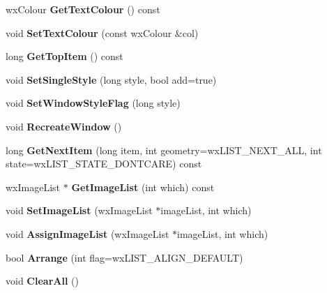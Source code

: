\begin{DoxyCompactItemize}
\item 
wxColour {\bfseries GetTextColour} () const \label{classMuleExtern_1_1wxGenericListCtrl_aceeba33a3060a6d8a3f05e4af5dd11f2}

\item 
void {\bfseries SetTextColour} (const wxColour \&col)\label{classMuleExtern_1_1wxGenericListCtrl_a15f3ca4c17eb562099e920ca160985a6}

\item 
long {\bfseries GetTopItem} () const \label{classMuleExtern_1_1wxGenericListCtrl_af7c938efcfb67ae9c679bbf781a3a7a1}

\item 
void {\bfseries SetSingleStyle} (long style, bool add=true)\label{classMuleExtern_1_1wxGenericListCtrl_af22cfbb9913852ce523922f6cfca16a2}

\item 
void {\bfseries SetWindowStyleFlag} (long style)\label{classMuleExtern_1_1wxGenericListCtrl_ae272368f381b9e2ed26b5ae1fe597c14}

\item 
void {\bfseries RecreateWindow} ()\label{classMuleExtern_1_1wxGenericListCtrl_a72739b9b268e01dd5c17028ea0ebf7e2}

\item 
long {\bfseries GetNextItem} (long item, int geometry=wxLIST\_\-NEXT\_\-ALL, int state=wxLIST\_\-STATE\_\-DONTCARE) const \label{classMuleExtern_1_1wxGenericListCtrl_a5eb13bcdfaec73eb60e7e4f31037eef2}

\item 
wxImageList $\ast$ {\bfseries GetImageList} (int which) const \label{classMuleExtern_1_1wxGenericListCtrl_a79a404b87229602db1b6322b5716abc5}

\item 
void {\bfseries SetImageList} (wxImageList $\ast$imageList, int which)\label{classMuleExtern_1_1wxGenericListCtrl_a6260d4dd6e931a4bf5cc26564d89074e}

\item 
void {\bfseries AssignImageList} (wxImageList $\ast$imageList, int which)\label{classMuleExtern_1_1wxGenericListCtrl_a4ccfccdae29c8fcbf91f34dae3d3b391}

\item 
bool {\bfseries Arrange} (int flag=wxLIST\_\-ALIGN\_\-DEFAULT)\label{classMuleExtern_1_1wxGenericListCtrl_af041785d899b9303f703042a79632c38}

\item 
void {\bfseries ClearAll} ()\label{classMuleExtern_1_1wxGenericListCtrl_a6e769672645190f9c53100e5657eb04e}


\end{DoxyCompactItemize}
